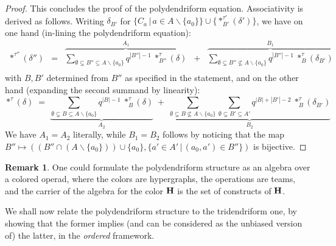 \documentclass[11pt]{article}
\theoremstyle{definition}
\newtheorem{remark}[theo]{Remark}
\numberwithin{equation}{section}
\numberwithin{equation}{section}
\newcommand{\set}[1]{\{#1\}}
\newcommand{\hyper}[1]{{\bf #1}}
\newcommand{\incs}{\subsetneq}
\begin{document}
\begin{proof}
This concludes the proof of the polydendriform equation.
Associativity is derived as follows. Writing $\delta_{B'}$ for $\{C_a\,|\,a\in A\backslash\{a_0\}\}\cup \{\ast^{\tau'}_{B'}(\delta')\}$, we have  on one hand (in-lining the polydendriform equation):
$$\begin{array}{lllll}
\ast^{\tau''}(\delta'') & = & \overbrace{\sum_{\emptyset\incs B''\subseteq A\backslash\set{a_0}} q^{{|B''|}-1} \:\ast^{\tau}_{B''}(\delta)}^{A_1} & +
& \overbrace{\sum_{\emptyset\incs B''\not\subseteq A\backslash\set{a_0}} q^{{|B''|}-1} \:\ast^{\tau}_B(\delta_{B'})}^{B_1}\\
\end{array}
$$
with $B,B'$ determined from $B''$ as specified in the statement, and on the other hand  (expanding the second summand by linearity):
$$
\ast^{\tau}(\delta)\; =\;  \underbrace{\sum_{\emptyset\incs B\subseteq A\backslash\set{a_0}} q^{{|B|}-1} \:\ast^{\tau}_{B}(\delta)}_{A_2} \; + \;
\underbrace{\sum_{\emptyset\incs B\not\subseteq A\backslash\set{a_0}}  \sum_{\emptyset\incs B'\subseteq A'}q^{|B|+|B'|-2} \:\ast^{\tau}_B(\delta_{B'})}_{B_2}
$$
We have $A_1=A_2$ literally, while $B_1=B_2$ follows by noticing that the map $B''\mapsto ((B''\cap(A\backslash\{a_0\}))\cup\{a_0\},\{a'\in A'\,|\, (a_0,a')\in B''\})$ is bijective. 
\end{proof}

 



\begin{remark} One could formulate the polydendriform structure as an algebra over a colored operad, where the colors are hypergraphs, the operations are teams, and the carrier of the algebra for the color $\hyper{H}$ is the set of constructs of $\hyper{H}$.
\end{remark}

We shall now relate the polydendriform structure to the tridendriform one, by showing that  the former implies (and can be considered as the unbiased version of) the latter, in the {\em ordered}   framework. 
\end{document}
